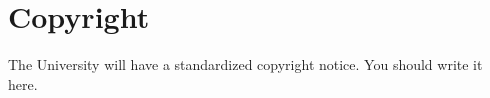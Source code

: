 \clearpage
\chapter*{Copyright}

The University will have a standardized copyright notice. You should write it here.
